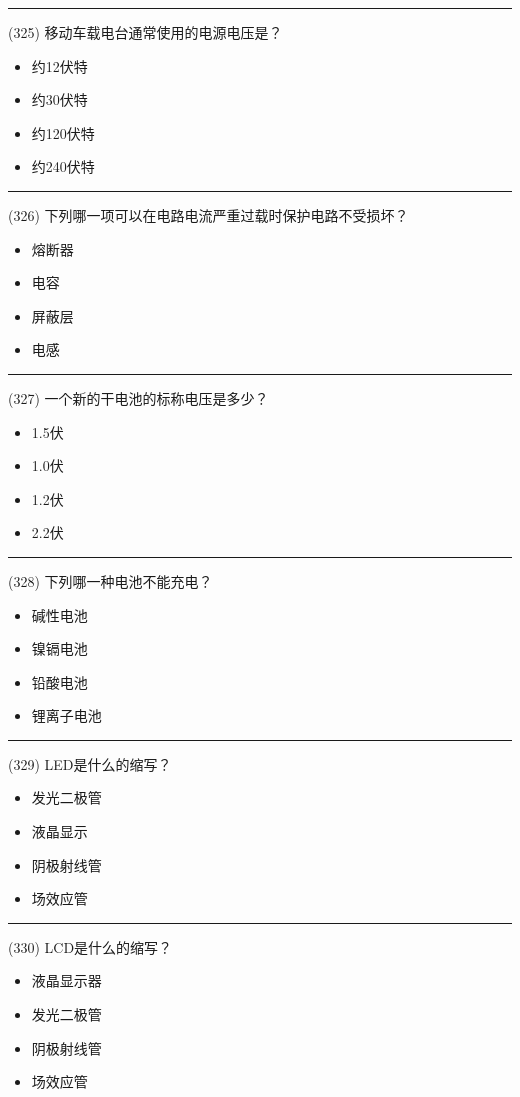\documentclass[twocolumn]{ctexart}  %
\begin{document}
\noindent\rule{0.5\textwidth}{1pt}
\heiti (325) 移动车载电台通常使用的电源电压是？ \songti {\color{gray} [LK1137] }
\begin{itemize}
	\item  约12伏特
	\item  约30伏特
	\item  约120伏特
	\item  约240伏特
\end{itemize}


\noindent\rule{0.5\textwidth}{1pt}
\heiti (326) 下列哪一项可以在电路电流严重过载时保护电路不受损坏？ \songti {\color{gray} [LK1151] }
\begin{itemize}
	\item  熔断器
	\item  电容
	\item  屏蔽层
	\item  电感
\end{itemize}


\noindent\rule{0.5\textwidth}{1pt}
\heiti (327) 一个新的干电池的标称电压是多少？ \songti {\color{gray} [LK1153] }
\begin{itemize}
	\item  1.5伏
	\item  1.0伏
	\item  1.2伏
	\item  2.2伏
\end{itemize}


\noindent\rule{0.5\textwidth}{1pt}
\heiti (328) 下列哪一种电池不能充电？ \songti {\color{gray} [LK1154] }
\begin{itemize}
	\item  碱性电池
	\item  镍镉电池
	\item  铅酸电池
	\item  锂离子电池
\end{itemize}


\noindent\rule{0.5\textwidth}{1pt}
\heiti (329) LED是什么的缩写？ \songti {\color{gray} [LK1162] }
\begin{itemize}
	\item  发光二极管
	\item  液晶显示
	\item  阴极射线管
	\item  场效应管
\end{itemize}


\noindent\rule{0.5\textwidth}{1pt}
\heiti (330) LCD是什么的缩写？ \songti {\color{gray} [LK1163] }
\begin{itemize}
	\item  液晶显示器
	\item  发光二极管
	\item  阴极射线管
	\item  场效应管
\end{itemize}
\end{document}
